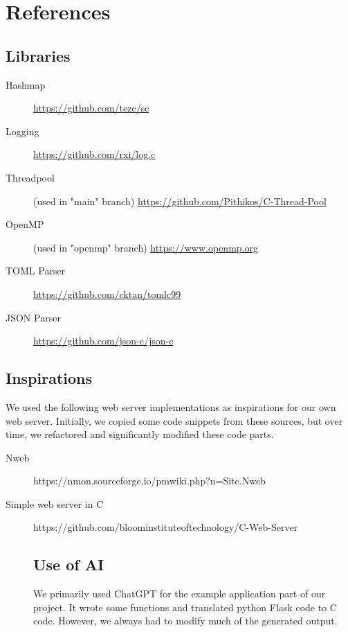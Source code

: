 \section*{References}

\subsection*{Libraries}
\begin{description}
    \item[Hashmap] \url{https://github.com/tezc/sc}
    \item[Logging] \url{https://github.com/rxi/log.c}
    \item[Threadpool] (used in "main" branch) \url{https://github.com/Pithikos/C-Thread-Pool}
    \item[OpenMP] (used in "openmp" branch) \url{https://www.openmp.org}
    \item[TOML Parser] \url{https://github.com/cktan/tomlc99}
    \item[JSON Parser] \url{https://github.com/json-c/json-c}
\end{description}

\subsection*{Inspirations}

We used the following web server implementations as inspirations for our own web server. Initially, we copied some code snippets from these sources, but over time, we refactored and significantly modified these code parts.

\begin{description}
    \item[Nweb] https://nmon.sourceforge.io/pmwiki.php?n=Site.Nweb
    \item[Simple web server in C] https://github.com/bloominstituteoftechnology/C-Web-Server

\subsection*{Use of AI}
We primarily used ChatGPT for the example application part of our project. It wrote some functions and translated python Flask code to C code. However, we always had to modify much of the generated output.

\end{description}

